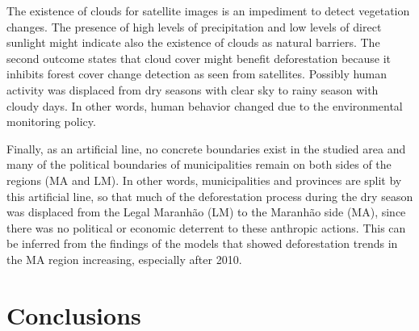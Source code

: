 
The existence of clouds for satellite images is an impediment to detect vegetation changes. The presence of high levels of precipitation and low levels of direct sunlight might indicate also the existence of clouds as natural barriers. The second outcome states that cloud cover might benefit deforestation because it inhibits forest cover change detection as seen from satellites. Possibly human activity was displaced from dry seasons with clear sky to rainy season with cloudy days. In other words, human behavior changed due to the environmental monitoring policy. 


Finally, as an artificial line, no concrete boundaries exist in the studied area and many of the political boundaries of municipalities remain on both sides of the regions (MA and LM). In other words, municipalities and provinces are split by this artificial line, so that much of the deforestation process during the dry season was displaced from the Legal Maranhão (LM) to the Maranhão side (MA), since there was no political or economic deterrent to these anthropic actions. This can be inferred from the findings of the models that showed deforestation trends in the MA region increasing, especially after 2010. 




\section{Conclusions}

